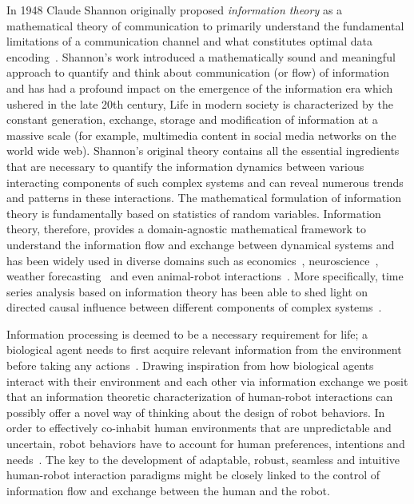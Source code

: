 \documentclass[letterpaper, 10 pt, conference]{ieeeconf}  %
\begin{document}
In 1948 Claude Shannon originally proposed \textit{information theory} as a mathematical theory of communication to primarily understand the fundamental limitations of a communication channel and what constitutes optimal data encoding~\cite{shannon2001mathematical}. Shannon's work introduced a mathematically sound and meaningful approach to quantify and think about communication (or flow) of information and has had a profound impact on the emergence of the information era which ushered in the late 20th century, Life in modern society is characterized by the constant generation, exchange, storage and modification of information at a massive scale (for example, multimedia content in social media networks on the world wide web). Shannon's original theory contains all the essential ingredients that are necessary to quantify the information dynamics between various interacting components of such complex systems and can reveal numerous trends and patterns in these interactions. The mathematical formulation of information theory is fundamentally based on statistics of random variables. Information theory, therefore, provides a domain-agnostic mathematical framework to understand the information flow and exchange between dynamical systems and has been widely used in diverse domains such as economics~\cite{maasoumi1993compendium}, neuroscience~\cite{wibral2014directed}, weather forecasting~\cite{kleeman2007information} and even animal-robot interactions~\cite{butail2014information}. More specifically, time series analysis based on information theory has been able to shed light on directed causal influence between different components of complex systems~\cite{hlavavckova2007causality}. 

Information processing is deemed to be a necessary requirement for life; a biological agent needs to first acquire relevant information from the environment before taking any actions~\cite{ashby1991requisite}. Drawing inspiration from how biological agents interact with their environment and each other via information exchange we posit that an information theoretic characterization of human-robot interactions can possibly offer a novel way of thinking about the design of robot behaviors. In order to effectively co-inhabit human environments that are unpredictable and uncertain, robot behaviors have to account for human preferences, intentions and needs~\cite{wasson2003user}.  The key to the development of adaptable, robust, seamless and intuitive human-robot interaction paradigms might be closely linked to the control of information flow and exchange between the human and the robot.  
\end{document}
